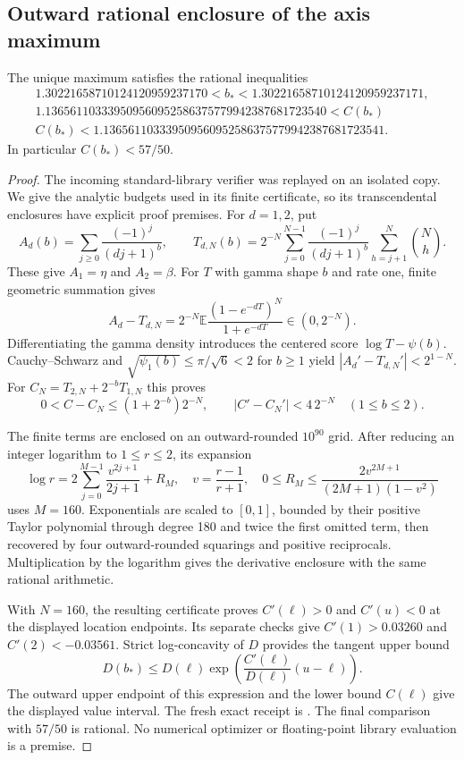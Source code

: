 \subsection{Outward rational enclosure of the axis maximum}
\begin{theorem}\label{envref:thm:certificate}
The unique maximum satisfies the rational inequalities
\begin{gather*}
 1.30221658710124120959237170<b_*<1.30221658710124120959237171,\\
 1.136561103339509560952586375779942387681723540
 <C(b_*)\\
 C(b_*)<1.136561103339509560952586375779942387681723541.
\end{gather*}
In particular $C(b_*)<57/50$.
\end{theorem}
\begin{proof}
The incoming standard-library verifier
 was replayed on an isolated copy.
We give the analytic budgets used in its finite certificate, so its
transcendental enclosures have explicit proof premises.
For $d=1,2$, put
\[
 A_d(b)=\sum_{j\ge0}\frac{(-1)^j}{(dj+1)^b},\qquad
 T_{d,N}(b)=2^{-N}\sum_{j=0}^{N-1}\frac{(-1)^j}{(dj+1)^b}
                          \sum_{h=j+1}^N\binom Nh.
\]
These give $A_1=\eta$ and $A_2=\beta$. For $T$ with gamma shape $b$
and rate one, finite geometric summation gives
\[
 A_d-T_{d,N}=2^{-N}\mathbb E
             \frac{(1-e^{-dT})^N}{1+e^{-dT}}\in(0,2^{-N}).
\]
Differentiating the gamma density introduces the centered score
$\log T-\psi(b)$. Cauchy--Schwarz and
$\sqrt{\psi_1(b)}\le\pi/\sqrt6<2$ for $b\ge1$ yield
$|A_d'-T_{d,N}'|<2^{1-N}$.
For $C_N=T_{2,N}+2^{-b}T_{1,N}$ this proves
\[
 0<C-C_N\le(1+2^{-b})2^{-N},\qquad
 |C'-C_N'|<4\,2^{-N}\quad(1\le b\le2).
\]

The finite terms are enclosed on an outward-rounded $10^{90}$ grid.
After reducing an integer logarithm to $1\le r\le2$, its expansion
\[
 \log r=2\sum_{j=0}^{M-1}\frac{v^{2j+1}}{2j+1}+R_M,
 \quad v=\frac{r-1}{r+1},\quad
 0\le R_M\le\frac{2v^{2M+1}}{(2M+1)(1-v^2)}
\]
uses $M=160$. Exponentials are scaled to $[0,1]$, bounded by their
positive Taylor polynomial through degree 180 and twice the first
omitted term, then recovered by four outward-rounded squarings and
positive reciprocals. Multiplication by the logarithm gives the
derivative enclosure with the same rational arithmetic.

With $N=160$, the resulting certificate proves $C'(\ell)>0$ and
$C'(u)<0$ at the displayed location endpoints. Its separate checks
give $C'(1)>0.03260$ and $C'(2)<-0.03561$.
Strict log-concavity of $D$ provides the tangent upper bound
\[
 D(b_*)\le D(\ell)
    \exp\left(\frac{C'(\ell)}{D(\ell)}(u-\ell)\right).
\]
The outward upper endpoint of this expression and the lower bound
$C(\ell)$ give the displayed value interval. The fresh exact receipt is
.
The final comparison with $57/50$ is rational. No numerical optimizer
or floating-point library evaluation is a premise.
\end{proof}

